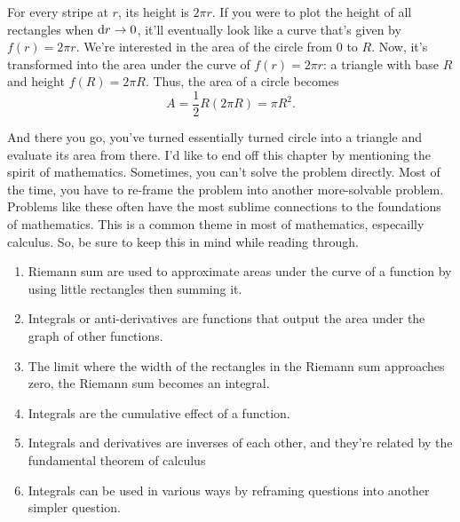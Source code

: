 For every stripe at $r$, its height is $2\pi r$. If you were to plot the height of all rectangles when $\odif{r} \appr 0$, it'll eventually look like a curve that's given by $f(r) = 2\pi r$. We're interested in the area of the circle from $0$ to $R$. Now, it's transformed into the area under the curve of $f(r) = 2\pi r$: a triangle with base $R$ and height $f(R) = 2\pi R$. Thus, the area of a circle becomes
\begin{equation*}
    A = \frac{1}{2}R(2\pi R) = \pi R^2.
\end{equation*}

And there you go, you've turned essentially turned circle into a triangle and evaluate its area from there. I'd like to end off this chapter by mentioning the spirit of mathematics. Sometimes, you can't solve the problem directly. Most of the time, you have to re-frame the problem into another more-solvable problem. Problems like these often have the most sublime connections to the foundations of mathematics. This is a common theme in most of mathematics, especailly calculus. So, be sure to keep this in mind while reading through.

\conclusion

\begin{enumerate}
    \item Riemann sum are used to approximate areas under the curve of a function by using little rectangles then summing it.
    \item Integrals or anti-derivatives are functions that output the area under the graph of other functions.
    \item The limit where the width of the rectangles in the Riemann sum approaches zero, the Riemann sum becomes an integral.
    \item Integrals are the cumulative effect of a function.
    \item Integrals and derivatives are inverses of each other, and they're related by the fundamental theorem of calculus
    \item Integrals can be used in various ways by reframing questions into another simpler question.
\end{enumerate}
